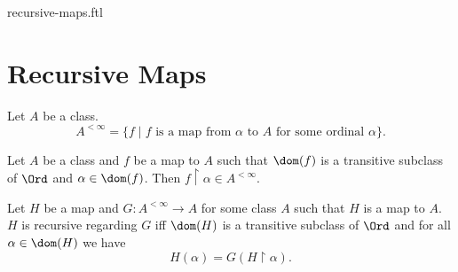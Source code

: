 \documentclass{naproche-library}
\begin{document}
\begin{smodule}{recursive-maps.ftl}

  \section*{Recursive Maps}

  \begin{definition}[forthel,id=SET_THEORY_04_1955917673267200]
    Let $A$ be a class.
    \[ A^{< \infty} = \{f \mid \text{$f$ is a map from $\alpha$ to $A$ for some ordinal $\alpha$} \}. \]
  \end{definition}

  \begin{proposition}[forthel,id=SET_THEORY_04_7841726894964736]
    Let $A$ be a class and $f$ be a map to $A$ such that $\dom(f)$ is a transitive subclass of $\Ord$ and $\alpha \in \dom(f)$.
    Then $f \restriction \alpha \in A^{< \infty}$.
  \end{proposition}

  \begin{forthel}
  \end{forthel}

  \begin{definition}[forthel,id=SET_THEORY_04_5597213870784512]
    Let $H$ be a map and $G : A^{< \infty} \to A$ for some class $A$ such that $H$ is a map to $A$.
    $H$ is recursive regarding $G$ iff $\dom(H)$ is a transitive subclass of $\Ord$ and for all $\alpha \in \dom(H)$ we have \[ H(\alpha) = G(H \restriction \alpha). \]
  \end{definition}

  \begin{forthel}
  \end{forthel}
\end{smodule}
\end{document}

